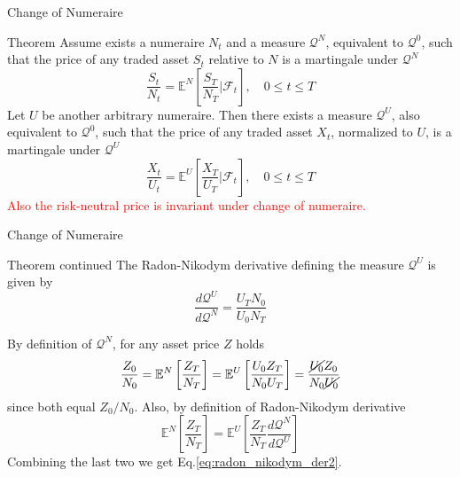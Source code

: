 \documentclass{beamer}
\begin{document}
\begin{frame}{Change of Numeraire}
	\begin{block}{Theorem}
	Assume exists a numeraire $N_t$ and a measure $\mathcal{Q}^N$, equivalent to $\mathcal{Q}^0$, such that the price of any traded asset $S_t$ relative to $N$ is a martingale under $\mathcal{Q}^N$
	\begin{equation*}
		\frac{S_t}{N_t} = \mathbb{E}^N\left[\frac{S_T}{N_T}\bigg|\mathcal{F}_t\right],\quad 0\le t \le T
	\end{equation*}
	Let $U$ be another arbitrary numeraire. Then there exists a measure $\mathcal{Q}^U$, also equivalent to $\mathcal{Q}^0$, such that the price of any traded asset $X_t$, normalized to $U$, is a martingale under $\mathcal{Q}^U$
	\begin{equation*}
		\frac{X_t}{U_t} = \mathbb{E}^U\left[\frac{X_T}{U_T}\bigg|\mathcal{F}_t\right],\quad 0\le t \le T
	\end{equation*}
	\textcolor{red}{Also the risk-neutral price is invariant under change of numeraire.}
	\end{block}
\end{frame}	

\begin{frame}{Change of Numeraire}
	\begin{block}{Theorem continued}
		The Radon-Nikodym derivative defining the measure $\mathcal{Q}^U$ is given by
		\begin{equation}
			\frac{d\mathcal{Q}^U}{d\mathcal{Q}^N} = \frac{U_T N_0}{U_0 N_T}
			\label{eq:radon_nikodym_der2}
		\end{equation}
	\end{block}	
	By definition of $\mathcal{Q}^N$, for any asset price $Z$ holds
	\begin{equation*}
		\frac{Z_0}{N_0} = 
		\mathbb{E}^N\left[\frac{Z_T}{N_T}\right] = \mathbb{E}^U\left[\frac{U_0 Z_T}{N_0 U_T}\right] =
		\frac{\cancel{U_0} Z_0}{N_0 \cancel{U_0}}
	\end{equation*}
	since both equal $Z_0/N_0$. Also, by definition of Radon-Nikodym derivative
	\begin{equation*}
		\mathbb{E}^N\left[\frac{Z_T}{N_T}\right] = \mathbb{E}^U\left[\frac{Z_T}{N_T} \frac{d\mathcal{Q}^N}{d\mathcal{Q}^U}\right]
	\end{equation*}
	Combining the last two we get Eq.\ref{eq:radon_nikodym_der2}.
\end{frame}
\end{document}
